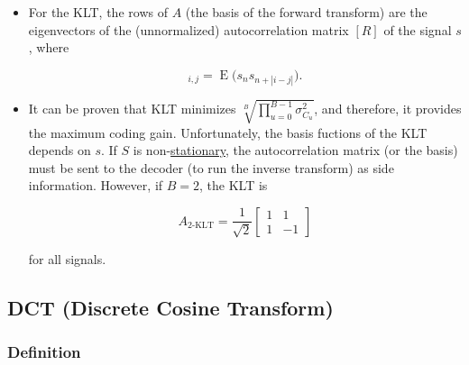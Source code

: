 \begin{itemize}
\item
  For the KLT, the rows of \(A\) (the basis of the forward transform)
  are the eigenvectors of the (unnormalized) autocorrelation matrix
  \([R]\) of the signal \(s\), where

  \begin{equation}
    [R]_{i,j} = \operatorname{E}\big(s_ns_{n+|i-j|}\big).
  \end{equation}
\item
  It can be proven that KLT minimizes
  \(\sqrt[B]{\prod_{u=0}^{B-1}\sigma_{C_u}^2}\), and therefore, it
  provides the maximum coding gain. Unfortunately, the basis fuctions of
  the KLT depends on \(s\). If \(S\) is
  non-\href{https://en.wikipedia.org/wiki/Stationary_process}{stationary},
  the autocorrelation matrix (or the basis) must be sent to the decoder
  (to run the inverse transform) as side information. However, if
  \(B=2\), the KLT is

  \begin{equation}
    A_{\text{2-KLT}} = \frac{1}{\sqrt{2}}
    \left[
      \begin{array}{cc}
        1 & 1 \\
        1 & -1
      \end{array}
    \right]
  \end{equation}

  for all signals.
\end{itemize}

    \hypertarget{dct-discrete-cosine-transform}{%
\subsection{DCT (Discrete Cosine
Transform)}\label{dct-discrete-cosine-transform}}

\hypertarget{definition}{%
\subsubsection{Definition}\label{definition}}

